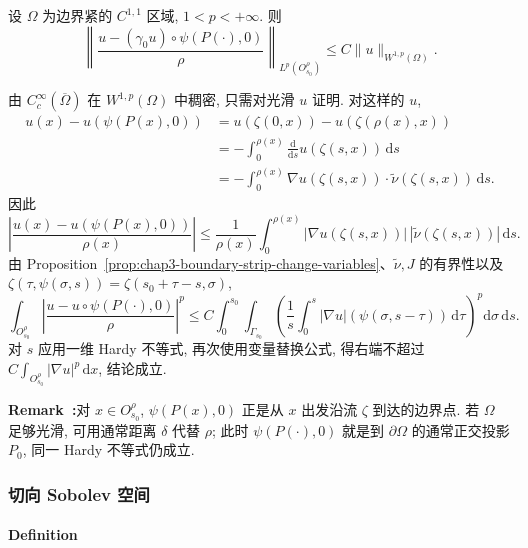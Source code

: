 \begin{Proposition}
\label{prop:chap3-normal-hardy-trace}
设 $\Omega$ 为边界紧的 $C^{1,1}$ 区域, $1<p<+\infty$. 则
\[
 \left\|\frac{u-(\gamma_0u)\circ\psi(P(\cdot),0)}\rho\right\|_{L^p(O_{s_0}^\rho)}
 \leq C\|u\|_{W^{1,p}(\Omega)}.
\]
\end{Proposition}

\begin{Proof}
由 $C_c^\infty(\overline\Omega)$ 在 $W^{1,p}(\Omega)$ 中稠密, 只需对光滑 $u$ 证明. 对这样的 $u$,
\begin{align*}
 u(x)-u(\psi(P(x),0))
 &=u(\zeta(0,x))-u(\zeta(\rho(x),x))\\
 &=-\int_0^{\rho(x)}\frac{\mathrm d}{\mathrm ds}u(\zeta(s,x))\,\mathrm ds\\
 &=-\int_0^{\rho(x)}\nabla u(\zeta(s,x))\cdot\widetilde\nu(\zeta(s,x))\,\mathrm ds.
\end{align*}
因此
\[
 \left|\frac{u(x)-u(\psi(P(x),0))}{\rho(x)}\right|
 \leq\frac1{\rho(x)}\int_0^{\rho(x)}
 |\nabla u(\zeta(s,x))|\,|\widetilde\nu(\zeta(s,x))|\,\mathrm ds.
\]
由 Proposition~\ref{prop:chap3-boundary-strip-change-variables}、$\widetilde\nu,J$ 的有界性以及 $\zeta(\tau,\psi(\sigma,s))=\zeta(s_0+\tau-s,\sigma)$,
\[
 \int_{O_{s_0}^\rho}\left|\frac{u-u\circ\psi(P(\cdot),0)}\rho\right|^p
 \leq C\int_0^{s_0}\int_{\Gamma_{s_0}}
 \left(\frac1s\int_0^s|\nabla u|(\psi(\sigma,s-\tau))\,\mathrm d\tau\right)^p
 \mathrm d\sigma\,\mathrm ds.
\]
对 $s$ 应用一维 Hardy 不等式, 再次使用变量替换公式, 得右端不超过 $C\int_{O_{s_0}^\rho}|\nabla u|^p\,\mathrm dx$, 结论成立.
\end{Proof}

\par\noindent{}\textbf{Remark~\thechapterthreesectionthreeremark:}\label{rem:chap3-projection-along-normal-flow}\quad 对 $x\in O_{s_0}^\rho$, $\psi(P(x),0)$ 正是从 $x$ 出发沿流 $\zeta$ 到达的边界点. 若 $\Omega$ 足够光滑, 可用通常距离 $\delta$ 代替 $\rho$; 此时 $\psi(P(\cdot),0)$ 就是到 $\partial\Omega$ 的通常正交投影 $P_0$, 同一 Hardy 不等式仍成立.

\subsubsection{切向 Sobolev 空间}
\label{subsec:chap3-tangential-sobolev-spaces}

\paragraph{Definition}

